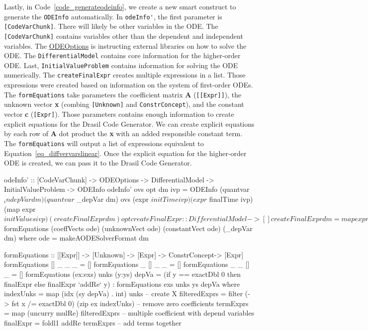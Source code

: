 Lastly, in Code~\ref{code_generateodeinfo}, we create a new smart construct to generate the \verb|ODEInfo| automatically. In \verb|odeInfo'|, the first parameter is \verb|[CodeVarChunk]|. There will likely be other variables in the ODE. The \verb|[CodeVarChunk]| contains variables other than the dependent and independent variables. The \href{https://jacquescarette.github.io/Drasil/docs/full/drasil-code-0.1.9.0/Language-Drasil-Data-ODEInfo.html#t:ODEOptions}{ODEOptions} is instructing external libraries on how to solve the ODE. The \verb|DifferentialModel| contains core information for the higher-order ODE. Last, \verb|InitialValueProblem| contains information for solving the ODE numerically. The \verb|createFinalExpr| creates multiple expressions in a list. Those expressions were created based on information on the system of first-order ODEs. The \verb|formEquations| take parameters the coefficient matrix \textbf{A} (\verb|[[Expr]]|), the unknown vector \textbf{x} (combing \verb|[Unknown]| and \verb|ConstrConcept|), and the constant vector \textbf{c} (\verb|[Expr]|). Those parameters contains enough information to create explicit equations for the Drasil Code Generator. We can create explicit equations by each row of \textbf{A} dot product the \textbf{x} with an added responsible constant term. The \verb|formEquations| will output a list of expressions equivalent to Equation~\ref{eq_diffvervarslinear}. Once the explicit equation for the higher-order ODE is created, we can pass it to the Drasil Code Generator.

\begin{listing}[ht]
\begin{haskell1}
odeInfo' :: [CodeVarChunk] -> ODEOptions -> DifferentialModel -> InitialValueProblem -> ODEInfo
odeInfo' ovs opt dm ivp = ODEInfo 
  (quantvar $ _indepVar dm) 
  (quantvar $ _depVar dm) 
  ovs 
  (expr $ initTime ivp)
  (expr $ finalTime ivp)
  (map expr $ initValues ivp)
  (createFinalExpr dm)
  opt

createFinalExpr :: DifferentialModel -> []
createFinalExpr dm = map expr $ formEquations (coeffVects ode) (unknownVect ode) (constantVect ode) (_depVar dm)
  where ode = makeAODESolverFormat dm

formEquations :: [[Expr]] -> [Unknown] -> [Expr] -> ConstrConcept-> [Expr]
formEquations [] _ _ _ = []
formEquations _ [] _ _ = []
formEquations _ _ [] _ = []
formEquations (ex:exs) unks (y:ys) depVa =
  (if y == exactDbl 0 then finalExpr else finalExpr `addRe` y) : formEquations exs unks ys depVa
  where indexUnks = map (idx (sy depVa) . int) unks -- create X
        filteredExprs = filter (\x -> fst x /= exactDbl 0) (zip ex indexUnks) -- remove zero coefficients
        termExprs = map (uncurry mulRe) filteredExprs -- multiple coefficient with depend variables
        finalExpr = foldl1 addRe termExprs -- add terms together
\end{haskell1}
\label{code_generateodeinfo}
\end{listing}
